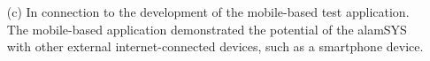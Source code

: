 \begin{itemize}
    \item[(c)] In connection to the development of the mobile-based test application. The mobile-based application 
    demonstrated the potential of the alamSYS with other external internet-connected devices, such as a smartphone device.
\end{itemize}